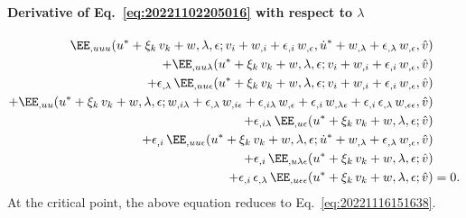 \paragraph{Derivative of Eq.~\eqref{eq:20221102205016} with respect to \(\lambda\)}
\begin{equation}
  \label{eq:20221116061057}
  \begin{aligned}[b]
    \EE_{,uuu}(u^\ast + \xi_k \, v_k + w, \lambda, \epsilon; v_i + w_{,i} + \epsilon_{,i} \, w_{,\epsilon}, \dot{u}^\ast + w_{,\lambda} + \epsilon_{,\lambda} \, w_{,\epsilon}, \hat{v})&\\
    + \EE_{,uu\lambda}(u^\ast + \xi_k \, v_k + w, \lambda, \epsilon; v_i + w_{,i} + \epsilon_{,i} \, w_{,\epsilon}, \hat{v})&\\
    + \epsilon_{,\lambda} \, \EE_{,uu\epsilon}(u^\ast + \xi_k \, v_k + w, \lambda, \epsilon; v_i + w_{,i} + \epsilon_{,i} \, w_{,\epsilon}, \hat{v})&\\
    + \EE_{,uu}(u^\ast + \xi_k \, v_k + w, \lambda, \epsilon; w_{,i\lambda} + \epsilon_{,\lambda} \, w_{,i\epsilon} + \epsilon_{,i\lambda} \, w_{,\epsilon} + \epsilon_{,i} \, w_{,\lambda\epsilon} + \epsilon_{,i} \, \epsilon_{,\lambda} \, w_{,\epsilon\epsilon}, \hat{v}) &\\
    + \epsilon_{,i\lambda} \, \EE_{,u\epsilon}(u^\ast + \xi_k \, v_k + w, \lambda, \epsilon; \hat{v}) &\\
    + \epsilon_{,i} \, \EE_{,uu\epsilon}(u^\ast + \xi_k \, v_k + w, \lambda, \epsilon; \dot{u}^\ast + w_{,\lambda} + \epsilon_{,\lambda} \, w_{,\epsilon}, \hat{v}) &\\
    + \epsilon_{,i} \, \EE_{,u\lambda\epsilon}(u^\ast + \xi_k \, v_k + w, \lambda, \epsilon; \hat{v}) &\\
    + \epsilon_{,i} \, \epsilon_{,\lambda} \, \EE_{,u\epsilon\epsilon}(u^\ast + \xi_k \, v_k + w, \lambda, \epsilon; \hat{v}) &= 0.
  \end{aligned}
\end{equation}
At the critical point, the above equation reduces to Eq.~\eqref{eq:20221116151638}.

